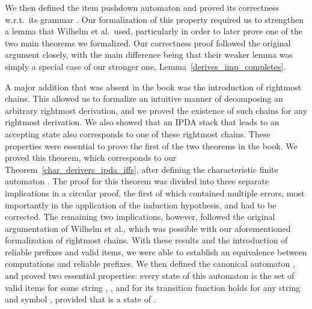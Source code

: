 \begin{isabellebody}
\begin{isamarkuptext}
We then defined the item pushdown automaton  and proved its correctness w.r.t.\ its grammar
. Our formalization of this property required us to strengthen a lemma that Wilhelm et al.\ used,
particularly in order to later prove one of the two main theorems we formalized. Our correctness
proof followed the original argument closely, with the main difference being that their weaker lemma 
was simply a special case of our stronger one, Lemma~\ref{derives_imp_completes}.

A major addition that was absent in the book was the introduction of rightmost chains. This allowed
us to formalize an intuitive manner of decomposing an arbitrary rightmost derivation, and we proved
the existence of such chains for any rightmost derivation. We also showed that an IPDA stack that
leads to an accepting state also corresponds to one of these rightmost chains. These properties were
essential to prove the first of the two theorems in the book. We proved this theorem, which
corresponds to our Theorem~\ref{char_derivers_ipda_iffs}, after defining the characteristic finite 
automaton . The proof for this theorem was divided into three separate implications
in a circular proof, the first of which contained multiple errors, most importantly in the
application of the induction hypothesis, and had to be corrected. The remaining two implications,
however, followed the original argumentation of Wilhelm et al., which was possible with our
aforementioned formalization of rightmost chains. With these results and the introduction of reliable
prefixes and valid items, we were able to establish an equivalence between
 computations and reliable prefixes. We then defined the canonical  automaton
, and proved two essential properties: every state of this automaton is the set of valid 
items for some string \isa{{\isasymgamma}}, , and for its transition function  holds 
 for any string \isa{{\isasymgamma}} and symbol , provided
that  is a state of .


\end{isamarkuptext}
\end{isabellebody}
